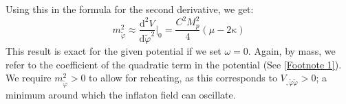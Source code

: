 \documentclass[aps,prd,reprint,preprintnumbers,showpacs,floatfix,nofootinbib,superscript address]{revtex4-2}
\begin{document}
Using this in the formula for the second derivative, we get:
\begin{equation}
    m_{\tilde{\varphi}}^2 \approx  \frac{\text{d}^2V}{\text{d}\tilde{\varphi}^2} \Bigg|_0 = \frac{C^2M_p^2}{4}(  \mu - 2\kappa)
\end{equation}
This result is exact for the given potential if we set $\omega = 0$. Again, by mass, we refer to the coefficient of the quadratic term in the potential (See \cref{Footnote 1}). We require $m_{\tilde{\varphi}}^2 > 0$ to allow for reheating, as this corresponds to $V_{,\tilde{\varphi}\tilde{\varphi}} > 0$; a minimum around which the inflaton field can oscillate.

\end{document}
